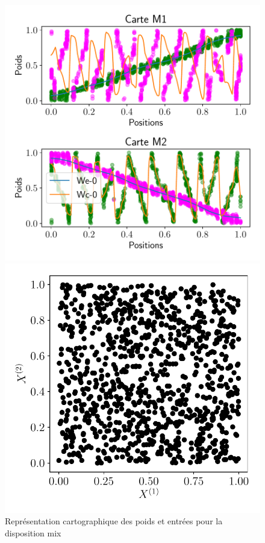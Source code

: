 \begin{figure}
	\begin{minipage}{0.66\textwidth}
		\includegraphics[width=\textwidth]{2som_square_w.pdf}
	\caption{Représentation cartographique des poids et entrées pour la disposition mix}
	\end{minipage}
	\begin{minipage}{0.33\textwidth}
		\includegraphics[width=\textwidth]{2som_square_in.pdf}
	\end{minipage}
\end{figure}


